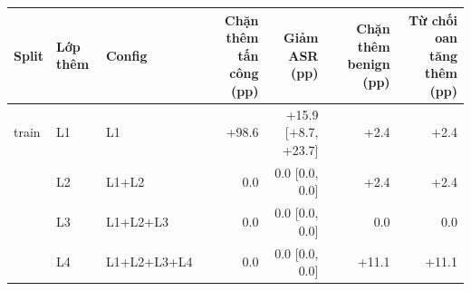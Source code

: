 \begin{tabular}{lllrrrr}
\toprule
Split & Lớp thêm & Config & Chặn thêm tấn công (pp) & Giảm ASR (pp) & Chặn thêm benign (pp) & Từ chối oan tăng thêm (pp) \\
\midrule
train & L1 & L1 & +98.6 & +15.9 [+8.7, +23.7] & +2.4 & +2.4 \\
 & L2 & L1+L2 & 0.0 & 0.0 [0.0, 0.0] & +2.4 & +2.4 \\
 & L3 & L1+L2+L3 & 0.0 & 0.0 [0.0, 0.0] & 0.0 & 0.0 \\
 & L4 & L1+L2+L3+L4 & 0.0 & 0.0 [0.0, 0.0] & +11.1 & +11.1 \\
\bottomrule
\end{tabular}
